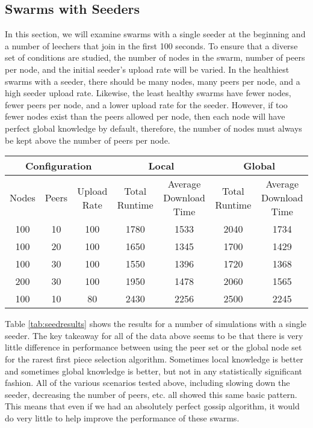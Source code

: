 \subsection{Swarms with Seeders}

In this section, we will examine swarms with a single seeder at the beginning
and a number of leechers that join in the first 100 seconds. To ensure
that a diverse set of conditions are studied, the number of nodes in the swarm, 
number of peers per node, and the initial seeder's upload rate will be varied.
In the healthiest swarms with a seeder, there should be many nodes, many peers per node, and
a high seeder upload rate. Likewise, the least healthy swarms have fewer nodes,
fewer peers per node, and a lower upload rate for the seeder. However, if too fewer
nodes exist than the peers allowed per node, then each node will have perfect global
knowledge by default, therefore, the number of nodes must always be kept above
the number of peers per node. 


\begin{table*}
\centering
\caption{Swarms with Seeds Results}
\begin{tabular}{|c|c|c|c|c|c|c|} \hline
\multicolumn{3}{|c|}{Configuration} & \multicolumn{2}{|c|}{Local} & \multicolumn{2}{|c|}{Global} \\ \hline
Nodes & Peers & Upload Rate & Total Runtime & Average Download Time & Total Runtime & Average Download Time\\ \hline

100 & 10 & 100 & 1780 & 1533 & 2040 & 1734\\
100 & 20 & 100 & 1650 & 1345 & 1700 & 1429\\
100 & 30 & 100 & 1550 & 1396 & 1720 & 1368\\
200 & 30 & 100 & 1950 & 1478 & 2060 & 1565\\
100 & 10 & 80  & 2430 & 2256 & 2500 & 2245\\
\hline\end{tabular}
\label{tab:seedresults}
\end{table*}


Table \ref{tab:seedresults} shows the results for a number of simulations with a single
seeder. The key takeaway for all of the data above seems to be that there
is very little difference in performance between using the peer set or the
global node set for the rarest first piece selection algorithm. Sometimes
local knowledge is better and sometimes global knowledge is better,
but not in any statistically significant fashion. All of the various
scenarios tested above, including slowing down the seeder, decreasing
the number of peers, etc. all showed this same basic pattern. This means
that even if we had an absolutely perfect gossip algorithm, it would do
very little to help improve the performance of these swarms.

